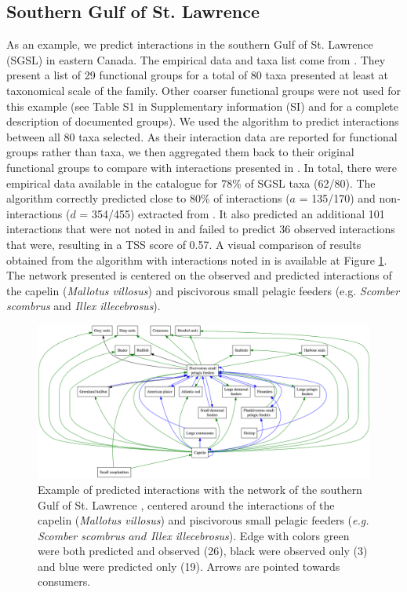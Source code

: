     \subsection{Southern Gulf of St. Lawrence}
As an example, we predict interactions in the southern Gulf of St. Lawrence (SGSL) in eastern Canada. The empirical data and taxa list come from \citet{savenkoff2004}. They present a list of 29 functional groups for a total of 80 taxa presented at least at taxonomical scale of the family. Other coarser functional groups were not used for this example (see Table S1 in Supplementary information (SI) and \citet{savenkoff2004} for a complete description of documented groups).
We used the algorithm to predict interactions between all 80 taxa selected. As their interaction data are reported for functional groups rather than taxa, we then aggregated them back to their original functional groups to compare with interactions presented in \citet{savenkoff2004}. In total, there were empirical data available in the catalogue for 78\% of SGSL taxa (62/80). The algorithm correctly predicted close to 80\% of interactions ($a$ = 135/170) and non-interactions ($d$ = 354/455) extracted from \citet{savenkoff2004}. It also predicted an additional 101 interactions that were not noted in \citet{savenkoff2004} and failed to predict 36 observed interactions that were, resulting in a TSS score of 0.57. A visual comparison of results obtained from the algorithm with interactions noted in \citet{savenkoff2004} is available at Figure \ref{fig:SGSL}. The network presented is centered on the observed and predicted interactions of the capelin (\textit{Mallotus villosus}) and piscivorous small pelagic feeders (e.g. \textit{Scomber scombrus} and \textit{Illex illecebrosus}).



\begin{figure}[H]
  \centering\includegraphics[width=\textwidth]{./figures/ch2-SGSL.png}
  \caption{Example of predicted interactions with the network of the southern Gulf of St. Lawrence \citep{savenkoff2004}, centered around the interactions of the capelin (\textit{Mallotus villosus}) and piscivorous small pelagic feeders (\textit{e.g. Scomber scombrus $and$ Illex illecebrosus}). Edge with colors green were both predicted and observed (26), black were observed only (3) and blue were predicted only (19). Arrows are pointed towards consumers.}
  \label{fig:SGSL}
\end{figure}

